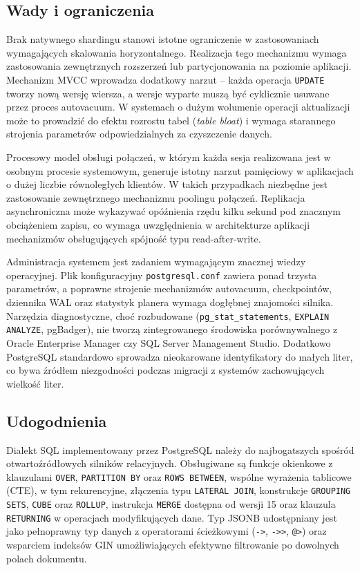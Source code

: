 \subsection{Wady i ograniczenia}

Brak natywnego shardingu stanowi istotne ograniczenie w zastosowaniach
wymagających skalowania horyzontalnego. Realizacja tego mechanizmu wymaga
zastosowania zewnętrznych rozszerzeń lub partycjonowania na poziomie aplikacji.
Mechanizm MVCC wprowadza dodatkowy narzut -- każda operacja \texttt{UPDATE}
tworzy nową wersję wiersza, a wersje wyparte muszą być cyklicznie usuwane
przez proces autovacuum. W systemach o dużym wolumenie operacji aktualizacji
może to prowadzić do efektu rozrostu tabel (\textit{table bloat}) i wymaga
starannego strojenia parametrów odpowiedzialnych za czyszczenie danych.

Procesowy model obsługi połączeń, w którym każda sesja realizowana jest
w osobnym procesie systemowym, generuje istotny narzut pamięciowy w aplikacjach
o dużej liczbie równoległych klientów. W takich przypadkach niezbędne jest
zastosowanie zewnętrznego mechanizmu poolingu połączeń. Replikacja
asynchroniczna może wykazywać opóźnienia rzędu kilku sekund pod znacznym
obciążeniem zapisu, co wymaga uwzględnienia w architekturze aplikacji
mechanizmów obsługujących spójność typu read-after-write.

Administracja systemem jest zadaniem wymagającym znacznej wiedzy operacyjnej.
Plik konfiguracyjny \texttt{postgresql.conf} zawiera ponad trzysta parametrów,
a poprawne strojenie mechanizmów autovacuum, checkpointów, dziennika WAL
oraz statystyk planera wymaga dogłębnej znajomości silnika. Narzędzia
diagnostyczne, choć rozbudowane (\texttt{pg\_stat\_statements},
\texttt{EXPLAIN ANALYZE}, pgBadger), nie tworzą zintegrowanego środowiska
porównywalnego z Oracle Enterprise Manager czy SQL Server Management Studio.
Dodatkowo PostgreSQL standardowo sprowadza nieokarowane identyfikatory do
małych liter, co bywa źródłem niezgodności podczas migracji z systemów
zachowujących wielkość liter.

\subsection{Udogodnienia}

Dialekt SQL implementowany przez PostgreSQL należy do najbogatszych spośród
otwartoźródłowych silników relacyjnych. Obsługiwane są funkcje okienkowe
z klauzulami \texttt{OVER}, \texttt{PARTITION BY} oraz \texttt{ROWS BETWEEN},
wspólne wyrażenia tablicowe (CTE), w tym rekurencyjne, złączenia typu
\texttt{LATERAL JOIN}, konstrukcje \texttt{GROUPING SETS}, \texttt{CUBE}
oraz \texttt{ROLLUP}, instrukcja \texttt{MERGE} dostępna od wersji 15
oraz klauzula \texttt{RETURNING} w operacjach modyfikujących dane. Typ JSONB
udostępniany jest jako pełnoprawny typ danych z operatorami ścieżkowymi
(\texttt{->}, \texttt{->>}, \texttt{@>}) oraz wsparciem indeksów GIN
umożliwiających efektywne filtrowanie po dowolnych polach dokumentu.

